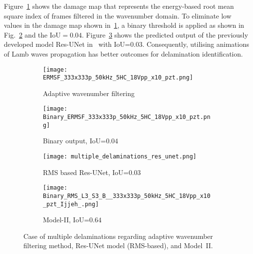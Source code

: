 \begin{sloppypar}
	Figure~\ref{fig:ERMSF} shows the damage map that represents the energy-based root mean square index of frames filtered in the wavenumber domain.
	To eliminate low values in the damage map shown in~\ref{fig:ERMSF}, a binary threshold is applied as shown in Fig.~\ref{fig:binary_ERMSF} and the IoU\(=0.04\).
	Figure~\ref{fig:Res_UNet} shows the predicted output of the previously developed model Res-UNet in~\cite{Ijjeh2022} with IoU=$0.03$.
	Consequently, utilising animations of Lamb waves propagation has better outcomes for delamination identification.
	
	\begin{figure} [!ht]
		\begin{subfigure}[b]{.48\textwidth}
			\centering
			\texttt{[image: ERMSF\_333x333p\_50kHz\_5HC\_18Vpp\_x10\_pzt.png]}
			\caption{Adaptive wavenumber filtering}
			\label{fig:ERMSF}
		\end{subfigure}
		\hfill
		\begin{subfigure}[b]{.48\textwidth}
			\centering
			\texttt{[image: Binary\_ERMSF\_333x333p\_50kHz\_5HC\_18Vpp\_x10\_pzt.png]}
			\caption{Binary output, IoU=$0.04$} 
			\label{fig:binary_ERMSF}
		\end{subfigure}
		\hfill
		\begin{subfigure}[b]{.48\textwidth}
			\centering
			\texttt{[image: multiple\_delaminations\_res\_unet.png]}
			\caption{RMS based Res-UNet, IoU=$0.03$} 
			\label{fig:Res_UNet}
		\end{subfigure}
		\hfill
		\begin{subfigure}[b]{.48\textwidth}
			\centering
			\texttt{[image: Binary\_RMS\_L3\_S3\_B\_\_333x333p\_50kHz\_5HC\_18Vpp\_x10\_pzt\_Ijjeh\_.png]}
			\caption{Model-II, IoU=\(0.64\)} 
			\label{fig:RMS_threshold_L3_S4_B_ijjeh_compare}
		\end{subfigure}
		\caption{Case of multiple delaminations regarding adaptive wavenumber filtering method, Res-UNet model (RMS-based), and Model~II.}
		\label{fig:comparison_all_models}
	\end{figure} 
\end{sloppypar}
